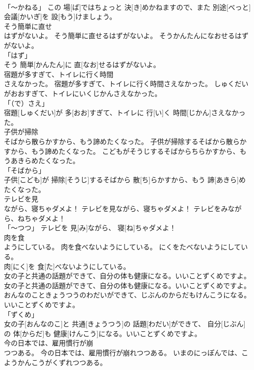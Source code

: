\documentclass[8pt]{extreport}
\begin{document}
\begin{CJK}{UTF8}{min}
\\	「～かねる」	この 場[ば]ではちょっと 決[き]めかねますので、また 別途[べっと] 会議[かいぎ]を 設[もう]けましょう。		
\\	そう簡単に直せ
\\	はずがないよ。	そう簡単に直せるはずがないよ。	そうかんたんになおせるはずがないよ。	
\\	「はず」 
\\	そう 簡単[かんたん]に 直[なお]せるはずがないよ。		
\\	宿題が多すぎて、トイレに行く時間
\\	さえなかった。	宿題が多すぎて、トイレに行く時間さえなかった。	しゅくだいがおおすぎて、トイレにいくじかんさえなかった。	
\\	「（で）さえ」 
\\	宿題[しゅくだい]が 多[おお]すぎて、トイレに 行[い]く 時間[じかん]さえなかった。		
\\	子供が掃除
\\	そばから散らかすから、もう諦めたくなった。	子供が掃除するそばから散らかすから、もう諦めたくなった。	こどもがそうじするそばからちらかすから、もうあきらめたくなった。	
\\	「そばから」 
\\	子供[こども]が 掃除[そうじ]するそばから 散[ち]らかすから、もう 諦[あきら]めたくなった。		
\\	テレビを見
\\	ながら、寝ちゃダメよ！	テレビを見ながら、寝ちゃダメよ！	テレビをみながら、ねちゃダメよ！	
\\	「～つつ」	テレビを 見[み]ながら、 寝[ね]ちゃダメよ！		
\\	肉を食
\\	ようにしている。	肉を食べないようにしている。	にくをたべないようにしている。	
\\	肉[にく]を 食[た]べないようにしている。		
\\	女の子と共通の話題ができて、自分の体も健康になる。いいことずくめですよ。	女の子と共通の話題ができて、自分の体も健康になる。いいことずくめですよ。	おんなのこときょうつうのわだいができて、じぶんのからだもけんこうになる。いいことずくめですよ。	
\\	「ずくめ」 
\\	女の子[おんなのこ]と 共通[きょうつう]の 話題[わだい]ができて、 自分[じぶん]の 体[からだ]も 健康[けんこう]になる。いいことずくめですよ。		
\\	今の日本では、雇用慣行が崩
\\	つつある。	今の日本では、雇用慣行が崩れつつある。	いまのにっぽんでは、こようかんこうがくずれつつある。	

\end{CJK}
\end{document}
